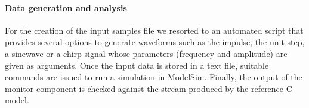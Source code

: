 \paragraph{Data generation and analysis} For the creation of the input samples file we resorted to an automated script that provides several options to generate waveforms such as the impulse, the unit step, a sinewave or a chirp signal whose parameters (frequency and amplitude) are given as arguments. Once the input data is stored in a text file, suitable commands are issued to run a simulation in ModelSim. Finally, the output of the monitor component is checked against the stream produced by the reference C model.
